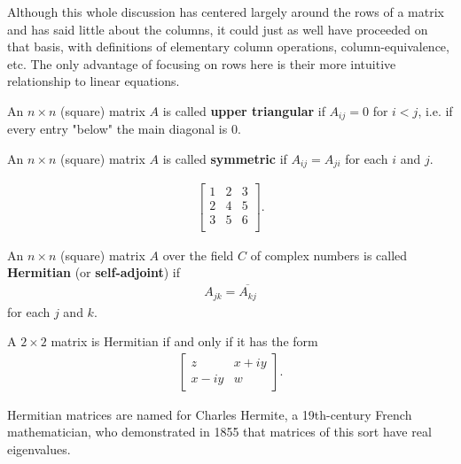 \documentclass[12pt]{article}
\begin{document}
\begin{comm}
  Although this whole discussion has centered largely around the
  rows of a matrix and has said little about the columns, it
  could just as well have proceeded on that basis, with
  definitions of elementary column operations,
  column-equivalence, etc. The only advantage of focusing on rows
  here is their more intuitive relationship to linear equations.
\end{comm}

\begin{defn}
  An $n \times n$ (square) matrix $A$ is called \textbf{upper
  triangular} if $A_{ij} = 0$ for $i < j$, i.e. if every entry
  "below" the main diagonal is $0$.
\end{defn}

\begin{defn}
  An $n \times n$ (square) matrix $A$ is called \textbf{symmetric} if $A_{ij} =
  A_{ji}$ for each $i$ and $j$.

  \begin{exm}
    \begin{align*}
      \begin{bmatrix}
        1 & 2 & 3\\
        2 & 4 & 5\\
        3 & 5 & 6\\
      \end{bmatrix}.
    \end{align*}
  \end{exm}
\end{defn}

\begin{defn}
  An $n \times n$ (square) matrix $A$ over the field $C$ of complex numbers is called
  \textbf{Hermitian} (or \textbf{self-adjoint}) if
  \begin{align*}
    A_{jk} = \overline{A_{kj}}
  \end{align*}
  for each $j$ and $k$.

  \begin{exm}
    A $2 \times 2$ matrix is Hermitian if and only if it has the form
    \begin{align*}
      \begin{bmatrix}
        z & x + iy\\
        x - iy & w
      \end{bmatrix}.
    \end{align*}
  \end{exm}

  Hermitian matrices are named for Charles Hermite, a 19th-century French
  mathematician, who demonstrated in 1855 that matrices of this sort have real
  eigenvalues.
\end{defn}
\end{document}
